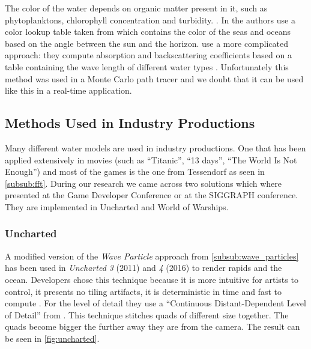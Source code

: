 The color of the water depends on organic matter present in it, such as
phytoplanktons, chlorophyll concentration and turbidity.
\autocite{darles2011survey}. In \autocite{gonzato2000modelling} the authors use
a color lookup table taken from \autocite{ivanoff1972introduction} which
contains the color of the seas and oceans based on the angle between the sun and
the horizon.  \citeauthor{premovze2001rendering} use a more complicated
approach: they compute absorption and backscattering coefficients based on a
table containing the wave length of different water types
\autocite{premovze2001rendering}.  Unfortunately this method was used in a Monte
Carlo path tracer and we doubt that it can be used like this in a real-time
application.


\subsection{Methods Used in Industry Productions}\label{subsec:methods_industry}


Many different water models are used in industry productions. One that has been
applied extensively in movies (such as ``Titanic'', ``13 days'', ``The World Is
Not Enough'') and most of the games is the one from Tessendorf
\autocite{tessendorf2001simulating} as seen in \cref{subsub:fft}. During our
research we came across two solutions which where presented at the Game
Developer Conference or at the SIGGRAPH conference. They are implemented in
Uncharted and World of Warships.

\subsubsection{Uncharted}\label{subsub:uncharted}

A modified version of the \textit{Wave Particle} approach from
\cref{subsub:wave_particles} has been used in \textit{Uncharted 3} (2011) and
\textit{4} (2016) to render rapids and the ocean. Developers chose this
technique because it is more intuitive for artists to control, it presents no
tiling artifacts, it is deterministic in time and fast to compute
\autocite{gonzalez2012water}. For the level of detail they use a ``Continuous
Distant-Dependent Level of Detail'' from \autocite{strugar2009continuous}. This
technique stitches quads of different size together. The quads become bigger the
further away they are from the camera. The result can be seen in
\autoref{fig:uncharted}.

